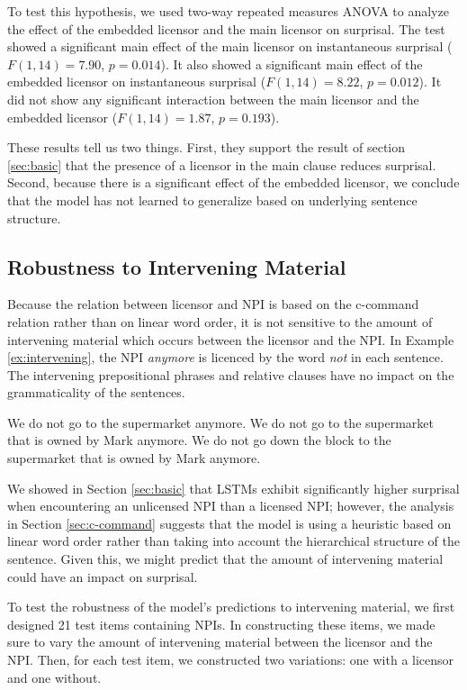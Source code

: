 \documentclass[11pt, round]{article}
\begin{document}
To test this hypothesis, we used two-way repeated measures ANOVA to analyze the effect of the embedded licensor and the main licensor on surprisal. The test showed a significant main effect of the main licensor on instantaneous surprisal ($F(1, 14) = 7.90$, $p = 0.014$). It also showed a significant main effect of the embedded licensor on instantaneous surprisal ($F(1, 14) = 8.22$, $p = 0.012$). It did not show any significant interaction between the main licensor and the embedded licensor ($F(1, 14) = 1.87$, $p = 0.193$).

These results tell us two things. First, they support the result of section \ref{sec:basic} that the presence of a licensor in the main clause reduces surprisal. Second, because there is a significant effect of the embedded licensor, we conclude that the model has not learned to generalize based on underlying sentence structure.

\subsection{Robustness to Intervening Material}

Because the relation between licensor and NPI is based on the c-command relation rather than on linear word order, it is not sensitive to the amount of intervening material which occurs between the licensor and the NPI. In Example \ref{ex:intervening}, the NPI \textit{anymore} is licenced by the word \textit{not} in each sentence. The intervening prepositional phrases and relative clauses have no impact on the grammaticality of the sentences.
\begin{exe}
\ex \label{ex:intervening}
\begin{xlist}
\ex We do not go to the supermarket anymore.
\ex We do not go to the supermarket that is owned by Mark anymore.
\ex We do not go down the block to the supermarket that is owned by Mark anymore. 
\end{xlist}
\end{exe}
We showed in Section \ref{sec:basic} that LSTMs exhibit significantly higher surprisal when encountering an unlicensed NPI than a licensed NPI; however, the analysis in Section \ref{sec:c-command} suggests that the model is using a heuristic based on linear word order rather than taking into account the hierarchical structure of the sentence. Given this, we might predict that the amount of intervening material could have an impact on surprisal. 

To test the robustness of the model's predictions to intervening material, we first designed 21 test items containing NPIs. In constructing these items, we made sure to vary the amount of intervening material between the licensor and the NPI. Then, for each test item, we constructed two variations: one with a licensor and one without.
\end{document}
